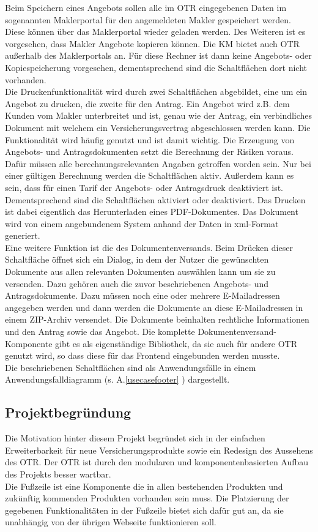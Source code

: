 Beim Speichern eines Angebots sollen alle im \ac{OTR} eingegebenen Daten im sogenannten Maklerportal für den angemeldeten Makler gespeichert werden. Diese können über das Maklerportal wieder geladen werden. Des Weiteren ist es vorgesehen, dass Makler Angebote kopieren können.
Die \ac{KM} bietet auch \ac{OTR} außerhalb des Maklerportals an. Für diese Rechner ist dann keine Angebots- oder Kopiespeicherung vorgesehen, dementsprechend sind die Schaltflächen dort nicht vorhanden. \\
Die Druckenfunktionalität wird durch zwei Schaltflächen abgebildet, eine um ein Angebot zu drucken, die zweite für den Antrag. Ein Angebot wird z.B. dem Kunden vom Makler unterbreitet und ist, genau wie der Antrag, ein verbindliches Dokument mit welchem ein Versicherungsvertrag abgeschlossen werden kann. Die Funktionalität wird häufig genutzt und ist damit wichtig. Die Erzeugung von Angebots- und Antragsdokumenten setzt die Berechnung der Risiken voraus. Dafür müssen alle berechnungsrelevanten Angaben getroffen worden sein. Nur bei einer gültigen Berechnung werden die Schaltflächen aktiv. Außerdem kann es sein, dass für einen Tarif der Angebots- oder Antragsdruck deaktiviert ist. Dementsprechend sind die Schaltflächen aktiviert oder deaktiviert. Das Drucken ist dabei eigentlich das Herunterladen eines PDF-Dokumentes. Das Dokument wird von einem angebundenem System anhand der Daten in \gls{xml}-Format generiert.\\
Eine weitere Funktion ist die des Dokumentenversands. Beim Drücken dieser Schaltfläche öffnet sich ein Dialog, in dem der Nutzer die gewünschten Dokumente aus allen relevanten Dokumenten auswählen kann um sie zu versenden. Dazu gehören auch die zuvor beschriebenen Angebots- und Antragsdokumente. Dazu müssen noch eine oder mehrere E-Mailadressen angegeben werden und dann werden die Dokumente an diese E-Mailadressen in einem ZIP-Archiv versendet. Die Dokumente beinhalten rechtliche Informationen und den Antrag sowie das Angebot. Die komplette Dokumentenversand-Komponente gibt es als eigenständige Bibliothek, da sie auch für andere \ac{OTR} genutzt wird, so dass diese für das Frontend eingebunden werden musste.\\
Die beschriebenen Schaltflächen sind als Anwendungsfälle in einem Anwendungsfalldiagramm (s. A.\ref{usecasefooter} ) dargestellt.

\subsection{Projektbegründung}
\label{projektbegründung}
Die Motivation hinter diesem Projekt begründet sich in der einfachen Erweiterbarkeit für neue Versicherungsprodukte sowie ein Redesign des Aussehens des \ac{OTR}. Der \ac{OTR} ist durch den modularen und komponentenbasierten Aufbau des Projekts besser wartbar. \\
Die Fußzeile ist eine Komponente die in allen bestehenden Produkten und zukünftig kommenden Produkten vorhanden sein muss. Die Platzierung der gegebenen Funktionalitäten in der Fußzeile bietet sich dafür gut an, da sie unabhängig von der übrigen Webseite funktionieren soll.
